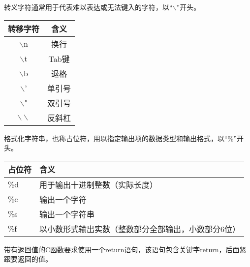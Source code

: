 \begin{frame}[fragile]
 
转义字符通常用于代表难以表达或无法键入的字符，以“$\backslash$”开头。
 
\begin{table}
\centering
\begin{tabular}{cc} \hline
转移字符 & 含义 \\ \hline  
$\backslash$n & 换行\\
$\backslash$t & Tab键\\
$\backslash$b & 退格\\
$\backslash$' & 单引号\\
$\backslash$" & 双引号\\
$\backslash\backslash$ & 反斜杠\\
\hline 
\end{tabular}
\end{table}
\end{frame}


\begin{frame}[fragile]
格式化字符串，也称占位符，用以指定输出项的数据类型和输出格式，以“\%”开头。

\begin{table}
\centering
\begin{tabular}{p{2cm}|p{8cm}}\hline
占位符 & 含义 \\ \hline  
\%d & 用于输出十进制整数（实际长度）\\[0.1in]
\%c & 输出一个字符\\[0.1in]
\%s & 输出一个字符串\\[0.1in]
\%f & 以小数形式输出实数（整数部分全部输出，小数部分6位）\\
\hline 
\end{tabular}
\end{table}
 
\end{frame}

\begin{frame}[fragile]


带有返回值的C函数要求使用一个return语句，该语句包含关键字return，后面紧跟要返回的值。

\end{frame}
